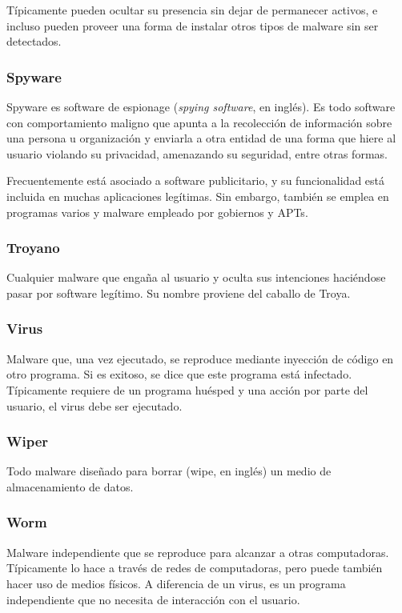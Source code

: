 \documentclass{article}
\begin{document}
Típicamente pueden ocultar su presencia sin dejar de permanecer activos, e incluso pueden proveer una forma de instalar otros tipos de malware sin ser detectados.

\subsubsection{Spyware}
Spyware es software de espionage ({\it spying software}, en inglés). Es todo software con comportamiento maligno que apunta a la recolección de información sobre una persona u organización y enviarla a otra entidad de una forma que hiere al usuario violando su privacidad, amenazando su seguridad, entre otras formas.

Frecuentemente está asociado a software publicitario, y su funcionalidad está incluida en muchas aplicaciones legítimas. Sin embargo, también se emplea en programas varios y malware empleado por gobiernos y APTs.

\subsubsection{Troyano}
Cualquier malware que engaña al usuario y oculta sus intenciones haciéndose pasar por software legítimo. Su nombre proviene del caballo de Troya.

\subsubsection{Virus}
Malware que, una vez ejecutado, se reproduce mediante inyección de código en otro programa. Si es exitoso, se dice que este programa está infectado. Típicamente requiere de un programa huésped y una acción por parte del usuario, el virus debe ser ejecutado.

\subsubsection{Wiper}
Todo malware diseñado para borrar (wipe, en inglés) un medio de almacenamiento de datos.

\subsubsection{Worm}
Malware independiente que se reproduce para alcanzar a otras computadoras. Típicamente lo hace a través de redes de computadoras, pero puede también hacer uso de medios físicos. A diferencia de un virus, es un programa independiente que no necesita de interacción con el usuario.
\end{document}
